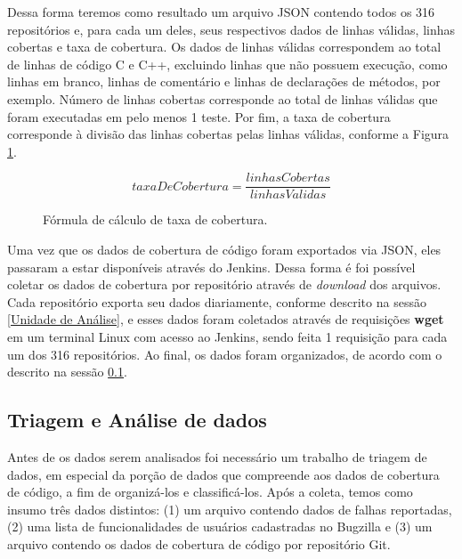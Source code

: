 \documentclass[11.5pt]{article}
\begin{document}
Dessa forma teremos como resultado um arquivo JSON contendo todos os 316 repositórios e, para cada
um deles, seus respectivos dados de linhas válidas, linhas cobertas e taxa de cobertura.
Os dados de linhas válidas correspondem ao total de linhas de código C e C++, excluindo linhas que
não possuem execução, como linhas em branco, linhas de comentário e linhas de declarações de
métodos, por exemplo. Número de linhas cobertas corresponde ao total de linhas válidas que foram
executadas em pelo menos 1 teste. Por fim, a taxa de cobertura corresponde à divisão das linhas
cobertas pelas linhas válidas, conforme a Figura \ref{fig:formulaTaxaDeCobertura}.

\begin{figure}[ht]
\label{fig:formulaTaxaDeCobertura}
    \[ taxaDeCobertura = \frac{linhasCobertas}{linhasValidas} \]
\caption{Fórmula de cálculo de taxa de cobertura.}
\end{figure}

Uma vez que os dados de cobertura de código foram exportados via JSON, eles passaram a estar
disponíveis através do Jenkins.
Dessa forma é foi possível coletar os dados de cobertura por repositório através de
\textit{download} dos arquivos.
Cada repositório exporta seu dados diariamente, conforme descrito na sessão
\ref{Unidade de Análise}, e esses dados foram coletados através de requisições \textbf{wget}
em um terminal Linux com acesso ao Jenkins, sendo feita 1 requisição para cada um dos 316
repositórios.
Ao final, os dados foram organizados, de acordo com o descrito na sessão \ref{sec:triagem}.



\subsection{Triagem e Análise de dados} \label{sec:triagem}

Antes de os dados serem analisados foi necessário um trabalho de triagem de dados, em especial da
porção de dados que compreende aos dados de cobertura de código, a fim de organizá-los e
classificá-los.
Após a coleta, temos como insumo três dados distintos:
(1) um arquivo contendo dados de falhas reportadas,
(2) uma lista de funcionalidades de usuários cadastradas no Bugzilla e
(3) um arquivo contendo os dados de cobertura de código por repositório Git.
\end{document}

